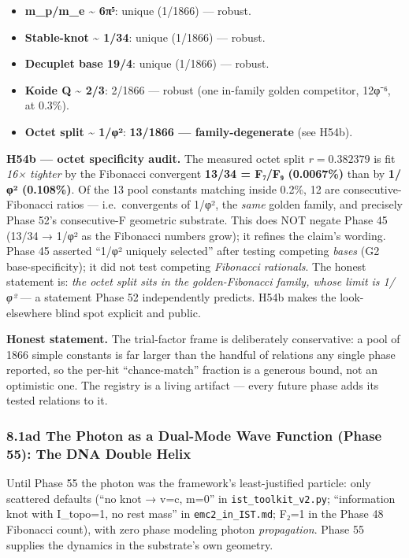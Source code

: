 \documentclass[
]{article}
\providecommand{\tightlist}{%
  \setlength{\itemsep}{0pt}\setlength{\parskip}{0pt}}
\begin{document}
\begin{itemize}
\tightlist
\item
  \textbf{m\_p/m\_e \textasciitilde{} 6π⁵}: unique (1/1866) --- robust.
\item
  \textbf{Stable-knot \textasciitilde{} 1/34}: unique (1/1866) ---
  robust.
\item
  \textbf{Decuplet base 19/4}: unique (1/1866) --- robust.
\item
  \textbf{Koide Q \textasciitilde{} 2/3}: 2/1866 --- robust (one
  in-family golden competitor, 12φ⁻⁶, at 0.3\%).
\item
  \textbf{Octet split \textasciitilde{} 1/φ²}: \textbf{13/1866 ---
  family-degenerate} (see H54b).
\end{itemize}

\textbf{H54b --- octet specificity audit.} The measured octet split
\(r = 0.382379\) is fit \emph{16× tighter} by the Fibonacci convergent
\textbf{13/34 = F₇/F₉ (0.0067\%)} than by \textbf{1/φ² (0.108\%)}. Of
the 13 pool constants matching inside 0.2\%, 12 are
consecutive-Fibonacci ratios --- i.e.~convergents of 1/φ², the
\emph{same} golden family, and precisely Phase 52's consecutive-F
geometric substrate. This does NOT negate Phase 45 (13/34 → 1/φ² as the
Fibonacci numbers grow); it refines the claim's wording. Phase 45
asserted ``1/φ² uniquely selected'' after testing competing \emph{bases}
(G2 base-specificity); it did not test competing \emph{Fibonacci
rationals}. The honest statement is: \emph{the octet split sits in the
golden-Fibonacci family, whose limit is 1/φ²} --- a statement Phase 52
independently predicts. H54b makes the look-elsewhere blind spot
explicit and public.

\textbf{Honest statement.} The trial-factor frame is deliberately
conservative: a pool of 1866 simple constants is far larger than the
handful of relations any single phase reported, so the per-hit
``chance-match'' fraction is a generous bound, not an optimistic one.
The registry is a living artifact --- every future phase adds its tested
relations to it.

\subsubsection{8.1ad The Photon as a Dual-Mode Wave Function (Phase 55):
The DNA Double
Helix}\label{ad-the-photon-as-a-dual-mode-wave-function-phase-55-the-dna-double-helix}

Until Phase 55 the photon was the framework's least-justified particle:
only scattered defaults (``no knot → v=c, m=0'' in
\texttt{ist\_toolkit\_v2.py}; ``information knot with I\_topo=1, no rest
mass'' in \texttt{emc2\_in\_IST.md}; F₂=1 in the Phase 48 Fibonacci
count), with zero phase modeling photon \emph{propagation}. Phase 55
supplies the dynamics in the substrate's own geometry.
\end{document}
